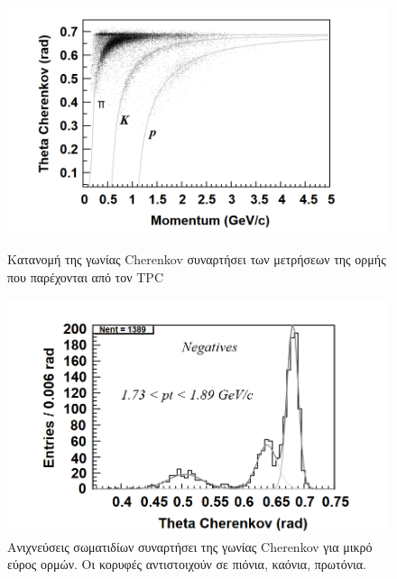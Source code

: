  	\begin{figure}[h!]
 	    \centering
 	    \begin{minipage}{.5\textwidth}
 	        \centering
 	        \includegraphics[scale=0.5]{STAR_Detectors/RICH_identif}
 	        \caption{Κατανομή της γωνίας Cherenkov συναρτήσει των μετρήσεων της ορμής που παρέχονται από τον TPC}
 	        \label{fig3.22}
 	    \end{minipage}%
 	    \begin{minipage}{0.5\textwidth}
 	        \centering
 	        \includegraphics[scale=0.5]{STAR_Detectors/RICH_identif2}
 	        \caption{Ανιχνεύσεις σωματιδίων συναρτήσει της γωνίας Cherenkov για μικρό εύρος ορμών. Οι κορυφές αντιστοιχούν σε πιόνια, καόνια, πρωτόνια.}
 	        \label{fig3.22}
 	    \end{minipage}
 	\end{figure}
 	
 	
 	